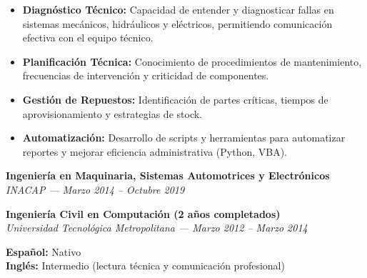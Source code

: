 \documentclass[10pt,letterpaper]{article}
\begin{document}
\vspace{0.3cm}

\vspace{0.4cm}

\vspace{0.3cm}

\begin{itemize}
    \item \textbf{Diagnóstico Técnico:} Capacidad de entender y diagnosticar fallas en sistemas mecánicos, hidráulicos y eléctricos, permitiendo comunicación efectiva con el equipo técnico.
    \item \textbf{Planificación Técnica:} Conocimiento de procedimientos de mantenimiento, frecuencias de intervención y criticidad de componentes.
    \item \textbf{Gestión de Repuestos:} Identificación de partes críticas, tiempos de aprovisionamiento y estrategias de stock.
    \item \textbf{Automatización:} Desarrollo de scripts y herramientas para automatizar reportes y mejorar eficiencia administrativa (Python, VBA).
\end{itemize}

\vspace{0.4cm}


\vspace{0.3cm}

\noindent \textbf{Ingeniería en Maquinaria, Sistemas Automotrices y Electrónicos} \\
\textit{INACAP — Marzo 2014 – Octubre 2019}

\vspace{0.2cm}

\noindent \textbf{Ingeniería Civil en Computación (2 años completados)} \\
\textit{Universidad Tecnológica Metropolitana — Marzo 2012 – Marzo 2014}

\vspace{0.4cm}


\vspace{0.3cm}

\noindent \textbf{Español:} Nativo \\
\noindent \textbf{Inglés:} Intermedio (lectura técnica y comunicación profesional)
\end{document}
